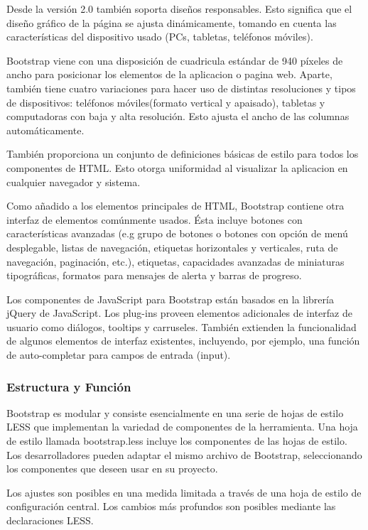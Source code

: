 Desde la versión 2.0 también soporta diseños responsables. Esto significa que el diseño gráfico de la página se ajusta dinámicamente, tomando en cuenta las características del dispositivo usado (PCs, tabletas, teléfonos móviles).


Bootstrap viene con una disposición de cuadricula estándar de 940 píxeles de ancho para posicionar los elementos de la aplicacion o pagina web. Aparte, también tiene cuatro variaciones para hacer uso de distintas resoluciones y tipos de dispositivos: teléfonos móviles(formato vertical y apaisado), tabletas y computadoras con baja y alta resolución. Esto ajusta el ancho de las columnas automáticamente.

También proporciona un conjunto de definiciones básicas de estilo para todos los componentes de HTML. Esto otorga uniformidad al visualizar la aplicacion en cualquier navegador y sistema.

Como añadido a los elementos principales de HTML, Bootstrap contiene otra interfaz de elementos comúnmente usados. Ésta incluye botones con características avanzadas (e.g grupo de botones o botones con opción de menú desplegable, listas de navegación, etiquetas horizontales y verticales, ruta de navegación, paginación, etc.), etiquetas, capacidades avanzadas de miniaturas tipográficas, formatos para mensajes de alerta y barras de progreso.

Los componentes de JavaScript para Bootstrap están basados en la librería jQuery de JavaScript. Los plug-ins proveen elementos adicionales de interfaz de usuario como diálogos, tooltips y carruseles. También extienden la funcionalidad de algunos elementos de interfaz existentes, incluyendo, por ejemplo, una función de auto-completar para campos de entrada (input). 

\subsubsection{Estructura y Función}
Bootstrap es modular y consiste esencialmente en una serie de hojas de estilo LESS que implementan la variedad de componentes de la herramienta. Una hoja de estilo llamada bootstrap.less incluye los componentes de las hojas de estilo. Los desarrolladores pueden adaptar el mismo archivo de Bootstrap, seleccionando los componentes que deseen usar en su proyecto.

Los ajustes son posibles en una medida limitada a través de una hoja de estilo de configuración central. Los cambios más profundos son posibles mediante las declaraciones LESS.

